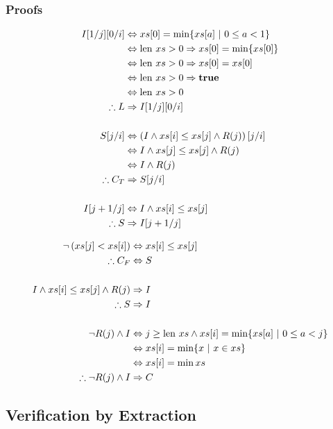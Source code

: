 \begin{lscape}
\begin{multicols}{3}
\subsubsection{Proofs}
\begin{align*}
  I[1/j][0/i] &\iff xs[0] = \min \{xs[a]~|~0 \leq a < 1\}\\
  &\iff \len xs > 0 \implies xs[0] = \min \{xs[0]\}\\
  &\iff \len xs > 0 \implies xs[0] = xs[0]\\
  &\iff \len xs > 0 \implies \true\\
  &\iff \len xs > 0\\
  \therefore L &\implies I[1/j][0/i]\\\\
%
  S[j/i] &\iff \left(I \land xs[i] \leq xs[j] \land R(j)\right)[j/i]\\
  &\iff I \land xs[j] \leq xs[j] \land R(j)\\
  &\iff I \land R(j)\\
  \therefore C_{T} &\implies S[j/i]\\\\
%
  I[j+1/j] &\iff I \land xs[i] \leq xs[j]\\
  \therefore S &\implies I[j+1/j]
\end{align*}

\begin{align*}
  \lnot\left(xs[j] < xs[i]\right) &\iff xs[i] \leq xs[j]\\
  \therefore C_{F} &\iff S\\\\
%
  I \land xs[i] \leq xs[j] \land R(j) &\implies I\\
  \therefore S &\implies I\\\\
%
  \lnot R(j) \land I &\iff j \geq \len xs \land xs[i] = \min
  \{xs[a]~|~0 \leq a < j\}\\
  &\iff xs[i] = \min \{x~|~x \in xs\}\\
  &\iff xs[i] = \min xs\\
  \therefore \lnot R(j) \land I &\implies C
\end{align*}
\vfill
\end{multicols}

\end{lscape}

\subsection{Verification by Extraction}

